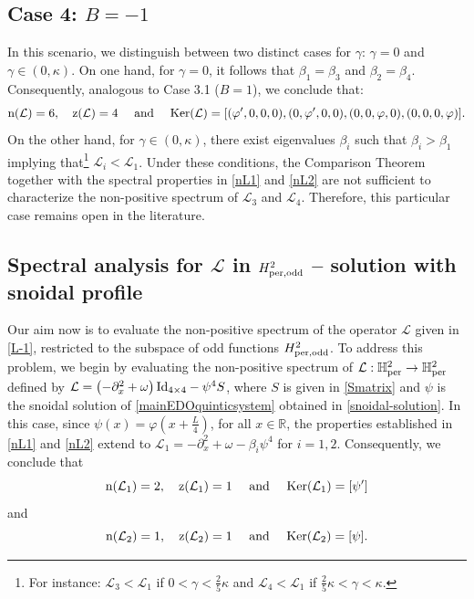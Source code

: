 \documentclass[10pt,reqno,a4paper]{amsart} %
\theoremstyle{definition} %
\numberwithin{equation}{section}
\numberwithin{figure}{section}
\begin{document}
\subsection*{Case 4: $B = -1$} In this scenario, we distinguish between two distinct cases for $\gamma$: $\gamma = 0$ and $\gamma \in (0,\kappa)$. On one hand, for $\gamma = 0$, it follows that $\beta_1 = \beta_3$ and $\beta_2 = \beta_4$. Consequently, analogous to Case 3.1 ($B=1$), we conclude that:
\begin{equation}\label{spectralanalysis-B1-gamma0}
    {\rm n}(\mathcal{L}) = 6, \quad {\rm z}(\mathcal{L}) = 4 \quad \text{ and } \quad {\rm Ker}(\mathcal{L}) = [(\varphi',0,0,0), (0,\varphi',0,0), (0,0,\varphi,0), (0,0,0,\varphi)].
\end{equation}
On the other hand, for $\gamma \in (0,\kappa)$, there exist eigenvalues $\beta_i$ such that $\beta_i > \beta_1$ implying that\footnote{  { For instance: $\mathcal{L}_3<\mathcal{L}_1$ if $0<\gamma<  \frac{2}{5}\kappa$ and $\mathcal{L}_4<\mathcal{L}_1$ if $\frac{2}{5}\kappa<\gamma< \kappa$.}} $\mathcal{L}_i < \mathcal{L}_1$. Under these conditions, the Comparison Theorem together with the spectral properties in \eqref{nL1} and \eqref{nL2} are not sufficient to characterize the non-positive spectrum of $\mathcal{L}_3$ and $\mathcal{L}_4$. Therefore, this particular case remains open in the literature.




\subsection{Spectral analysis for $\mathcal{L}$ in $H^2_{\rm per,odd}$ -- solution with snoidal profile}\label{spectral-analysis-snoidal}

Our aim now is to evaluate the non-positive spectrum of the operator $\mathcal{L}$ given in \eqref{L-1}, restricted to the subspace of odd functions $H^2_{\rm per,odd}$. To address this problem, we begin by evaluating the non-positive spectrum of $\mathcal{L} : \mathbb{H}^2_{\rm per} \rightarrow \mathbb{H}^2_{\rm per}$ defined by $\mathcal{L} = \left(-\partial_x^2 + \omega\right) {\rm Id}_{4 \times 4} - \psi^4 S$, where $S$ is given in \eqref{Smatrix} and $\psi$ is the snoidal solution of \eqref{mainEDOquinticsystem} obtained in \eqref{snoidal-solution}. In this case, since $\psi(x) = \varphi\left( x + \frac{L}{4} \right)$, for all $x \in \mathbb{R}$, the properties established in \eqref{nL1} and \eqref{nL2} extend to $\mathcal{L}_1 = -\partial_x^2 + \omega - \beta_i \psi^4$ for $i=1,2$. Consequently, we conclude that
\begin{equation}\label{nL1-psi}
    {\rm n}(\mathcal{L}_1) = 2, \quad {\rm z}(\mathcal{L}_1) = 1 \quad \text{ and } \quad {\rm Ker}(\mathcal{L}_1) = [\psi']
\end{equation}
and
\begin{equation}\label{nL2-psi}
    {\rm n}(\mathcal{L}_2) = 1, \quad {\rm z}(\mathcal{L}_2) = 1 \quad \text{ and } \quad {\rm Ker}(\mathcal{L}_2) = [\psi].
\end{equation}
\end{document}
